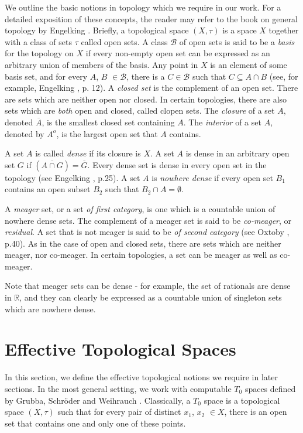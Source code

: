 \documentclass[a4paper,UKenglish,autoref,thm-restate,numberwithinsect]{lipics-v2021}
\begin{document}
We outline the basic notions in topology which we require in our work. For a detailed exposition of these concepts, the reader may refer to the book on general topology by Engelking \cite{Engelking1989}. Briefly, a topological space $(X,\tau)$ is a space $X$ together with a class of sets $\tau$ called open sets. A class $\mathcal{B}$ of open sets is said to be a \emph{basis} for the topology on $X$ if every non-empty open set can be expressed as an arbitrary union of members of the basis. Any point in $X$ is an element of some basis set, and for every $A$, $B$ $\in \mathcal{B}$, there is a $C \in \mathcal{B}$ such that $C \subseteq A \cap B$ (see, for example, Engelking \cite{Engelking1989}, p. 12). A \emph{closed set} is the complement of an open set. There are sets which are neither open nor closed. In certain topologies, there are also sets which are \emph{both} open and closed, called clopen sets. The \emph{closure} of a set $A$, denoted $\overline{A}$, is the smallest closed set containing $A$. The \textit{interior} of a set $A$, denoted by $A^o$, is the largest open set that $A$ contains. 

A set $A$ is called \emph{dense} if its closure is $X$. A set $A$ is dense in an arbitrary open set $G$ if $(\overline{A \cap G}) = \overline{G}$. Every dense set is dense in every open set in the topology (see Engelking \cite{Engelking1989}, p.25). A set $A$ is \emph{nowhere dense} if every open set $B_1$ contains an open subset $B_2$ such that $B_2 \cap A = \emptyset$. 

A \emph{meager} set, or a set \emph{of first category}, is one which is a countable union of nowhere dense sets. The complement of a meager set is said to be \emph{co-meager}, or \emph{residual}. A set that is not meager is said to be \emph{of second category} (see Oxtoby \cite{Oxtoby1980}, p.40). As in the case of open and closed sets, there are sets which are neither meager, nor co-meager. In certain topologies, a set can be meager as well as co-meager. 

Note that meager sets can be dense - for example, the set of rationals are dense in $\mathbb{R}$, and they can clearly be expressed as a countable union of singleton sets which are nowhere dense. 



\section{Effective Topological Spaces}\label{sec:efftopo}
In this section, we define the effective topological notions we require in later sections. In the most general setting, we work with computable $T_0$ spaces defined by Grubba, Schr\"oder and Weihrauch \cite{Grubba2007}. Classically, a $T_0$ space is a topological space $(X,\tau)$ such that for every pair of distinct $x_1$, $x_2$ $\in X$, there is an open set that contains one and only one of these points. 
\end{document}

